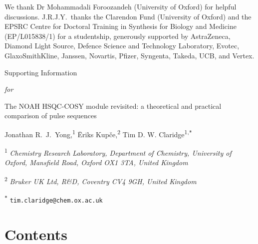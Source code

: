 \documentclass[a4paper,12pt]{article}
\newcommand{\me}{Jonathan R.\ J.\ Yong}
\newcommand{\meshort}{J.R.J.Y.}
\newcommand{\eriks}{{\=E}riks Kup{\v{c}}e}
\newcommand{\tim}{Tim D. W. Claridge}
\newcommand{\articletitle}{The NOAH HSQC-COSY module revisited: a theoretical and practical comparison of pulse sequences}
\newcommand{\crl}{Chemistry Research Laboratory, Department of Chemistry, University of Oxford, Mansfield Road, Oxford OX1 3TA, United Kingdom}
\newcommand{\brukeruk}{Bruker UK Ltd, R\&D, Coventry CV4 9GH, United Kingdom}
\begin{document}
\begin{refsection}
We thank Dr Mohammadali Foroozandeh (University of Oxford) for helpful discussions.
\meshort{}\ thanks the Clarendon Fund (University of Oxford) and the EPSRC Centre for Doctoral Training in Synthesis for Biology and Medicine (EP/L015838/1) for a studentship, generously supported by AstraZeneca, Diamond Light Source, Defence Science and Technology Laboratory, Evotec, GlaxoSmithKline, Janssen, Novartis, Pfizer, Syngenta, Takeda, UCB, and Vertex.

\AtNextBibliography{\small}
\printbibliography{}
\end{refsection}



\clearpage
\begin{refsection}
\newcommand{\sectionbreak}{\clearpage}
\renewcommand*{\thefigure}{S\arabic{figure}}
\renewcommand*{\thesection}{S\arabic{section}}
\renewcommand*{\thetable}{S\arabic{table}}
\renewcommand*{\thepage}{S\arabic{page}}
\setcounter{page}{1}
\setcounter{figure}{0}
\setcounter{section}{0}
\setcounter{table}{0}
\onehalfspacing

\hspace{0pt}
\vfill
\begin{center}
    \huge
    Supporting Information

    \vspace{0.3cm}

    \textit{for}

    \vspace{0.3cm}

    \articletitle{}

    \vspace{0.6cm}

    \Large \me{},\textsuperscript{1} \eriks{},\textsuperscript{2} \tim{}\textsuperscript{1,\texttt{*}}

    \vspace{0.6cm}

    \large \textsuperscript{1} \textit{\crl{}}

    \textsuperscript{2} \textit{\brukeruk{}}

    \textsuperscript{\texttt{*}} \texttt{tim.claridge@chem.ox.ac.uk}

\end{center}
\vfill

\newpage
\section*{Contents}


\end{refsection}
\end{document}
